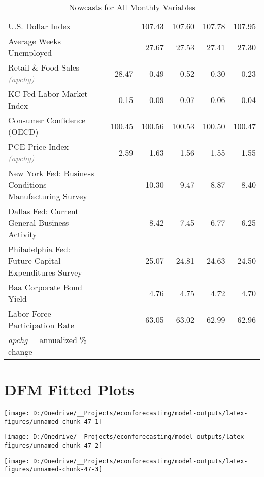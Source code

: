 \documentclass[11pt, letterpaper]{article}\usepackage[]{graphicx}\usepackage[]{color}
\begin{document}
\begin{table}[H]
\begin{tabular}{lrrrrrr}
  U.S. Dollar Index &  &  & 107.43 & 107.60 & 107.78 & 107.95 \\ 
  Average Weeks Unemployed &  &  & 27.67 & 27.53 & 27.41 & 27.30 \\ 
  Retail \& Food Sales \textit{\footnotesize\textcolor{gray}{(apchg)}} &  & 28.47 & 0.49 & -0.52 & -0.30 & 0.23 \\ 
  KC Fed Labor Market Index &  & 0.15 & 0.09 & 0.07 & 0.06 & 0.04 \\ 
  Consumer Confidence (OECD) &  & 100.45 & 100.56 & 100.53 & 100.50 & 100.47 \\ 
  PCE Price Index \textit{\footnotesize\textcolor{gray}{(apchg)}} &  & 2.59 & 1.63 & 1.56 & 1.55 & 1.55 \\ 
  New York Fed: Business Conditions Manufacturing Survey &  &  & 10.30 & 9.47 & 8.87 & 8.40 \\ 
  Dallas Fed: Current General Business Activity &  &  & 8.42 & 7.45 & 6.77 & 6.25 \\ 
  Philadelphia Fed: Future Capital Expenditures Survey &  &  & 25.07 & 24.81 & 24.63 & 24.50 \\ 
  Baa Corporate Bond Yield &  &  & 4.76 & 4.75 & 4.72 & 4.70 \\ 
  Labor Force Participation Rate &  &  & 63.05 & 63.02 & 62.99 & 62.96 \\ 
   \hline 
 \textit{apchg} = annualized \% change 
\end{tabular}
\endgroup
\caption{Nowcasts for All Monthly Variables} 
\end{table}



\appendix
\appendixpage
\addappheadtotoc

\section{DFM Fitted Plots}


{\centering \texttt{[image: D:/Onedrive/\_\_Projects/econforecasting/model-outputs/latex-figures/unnamed-chunk-47-1]} 

}




{\centering \texttt{[image: D:/Onedrive/\_\_Projects/econforecasting/model-outputs/latex-figures/unnamed-chunk-47-2]} 

}




{\centering \texttt{[image: D:/Onedrive/\_\_Projects/econforecasting/model-outputs/latex-figures/unnamed-chunk-47-3]} 

}
\end{document}
